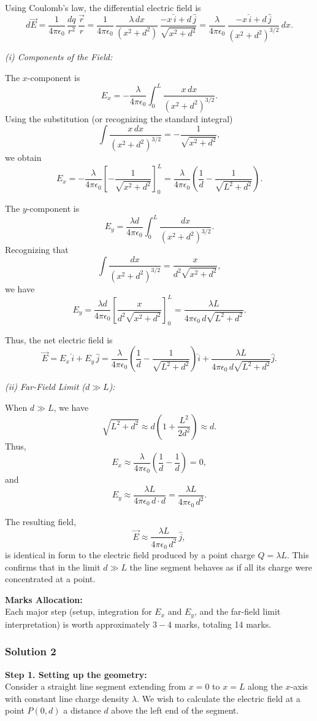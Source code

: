 \documentclass{article}
\begin{document}
Using Coulomb’s law, the differential electric field is
\[
d\vec{E} = \frac{1}{4\pi\epsilon_0}\,\frac{dq}{r^2}\,\frac{\vec{r}}{r} 
= \frac{1}{4\pi\epsilon_0}\,\frac{\lambda\,dx}{(x^2+d^2)}\,\frac{-x\,\hat{i}+d\,\hat{j}}{\sqrt{x^2+d^2}}
= \frac{\lambda}{4\pi\epsilon_0}\,\frac{-x\,\hat{i}+d\,\hat{j}}{(x^2+d^2)^{3/2}}\,dx.
\]

\emph{(i) Components of the Field:}

The \(x\)-component is
\[
E_x = -\frac{\lambda}{4\pi\epsilon_0}\int_{0}^{L} \frac{x\,dx}{(x^2+d^2)^{3/2}}.
\]
Using the substitution (or recognizing the standard integral)
\[
\int \frac{x\,dx}{(x^2+d^2)^{3/2}} = -\frac{1}{\sqrt{x^2+d^2}},
\]
we obtain
\[
E_x = -\frac{\lambda}{4\pi\epsilon_0}\left[-\frac{1}{\sqrt{x^2+d^2}}\right]_{0}^{L}
=\frac{\lambda}{4\pi\epsilon_0}\left(\frac{1}{d}-\frac{1}{\sqrt{L^2+d^2}}\right).
\]

The \(y\)-component is
\[
E_y = \frac{\lambda d}{4\pi\epsilon_0}\int_{0}^{L}\frac{dx}{(x^2+d^2)^{3/2}}.
\]
Recognizing that
\[
\int \frac{dx}{(x^2+d^2)^{3/2}} = \frac{x}{d^2\sqrt{x^2+d^2}},
\]
we have
\[
E_y = \frac{\lambda d}{4\pi\epsilon_0}\left[\frac{x}{d^2\sqrt{x^2+d^2}}\right]_{0}^{L}
=\frac{\lambda L}{4\pi\epsilon_0\,d\sqrt{L^2+d^2}}.
\]

Thus, the net electric field is
\[
\vec{E} = E_x\,\hat{i} + E_y\,\hat{j} 
=\frac{\lambda}{4\pi\epsilon_0}\left(\frac{1}{d}-\frac{1}{\sqrt{L^2+d^2}}\right)\hat{i} 
+\frac{\lambda L}{4\pi\epsilon_0\,d\sqrt{L^2+d^2}}\hat{j}.
\]

\emph{(ii) Far-Field Limit (\(d\gg L\)):}

When \(d\gg L\), we have
\[
\sqrt{L^2+d^2}\approx d\left(1+\frac{L^2}{2d^2}\right)\approx d.
\]
Thus,
\[
E_x \approx \frac{\lambda}{4\pi\epsilon_0}\left(\frac{1}{d}-\frac{1}{d}\right)=0,
\]
and
\[
E_y \approx \frac{\lambda L}{4\pi\epsilon_0\,d\cdot d}
=\frac{\lambda L}{4\pi\epsilon_0\,d^2}.
\]

The resulting field,
\[
\vec{E}\approx \frac{\lambda L}{4\pi\epsilon_0\,d^2}\,\hat{j},
\]
is identical in form to the electric field produced by a point charge \(Q=\lambda L\). This confirms that in the limit \(d\gg L\) the line segment behaves as if all its charge were concentrated at a point.

\textbf{Marks Allocation:} \\
Each major step (setup, integration for \(E_x\) and \(E_y\), and the far-field limit interpretation) is worth approximately \(3-4\) marks, totaling 14 marks.


\subsubsection{Solution 2}
\textbf{Step 1. Setting up the geometry:} \\
Consider a straight line segment extending from \(x=0\) to \(x=L\) along the \(x\)-axis with constant line charge density \(\lambda\). We wish to calculate the electric field at a point \(P(0,d)\) a distance \(d\) above the left end of the segment.
\end{document}
